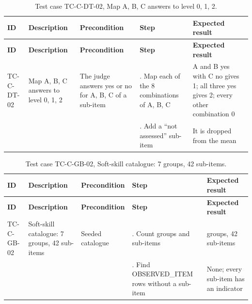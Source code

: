 {\small
\begin{longtable}{|>{\raggedright\arraybackslash}p{}|>{\raggedright\arraybackslash}p{}|>{\raggedright\arraybackslash}p{}|>{\raggedright\arraybackslash}p{}|>{\raggedright\arraybackslash}p{}|}
\caption{Test case TC-C-DT-02, Map A, B, C answers to level 0, 1, 2.} \\
\hline
\textbf{ID} & \textbf{Description} & \textbf{Precondition} & \textbf{Step} & \textbf{Expected result} \\ \hline
\endfirsthead
\hline
\textbf{ID} & \textbf{Description} & \textbf{Precondition} & \textbf{Step} & \textbf{Expected result} \\ \hline
\endhead
TC-C-DT-02 & Map A, B, C answers to level 0, 1, 2 & The judge answers yes or no for A, B, C of a sub-item & 1. Map each of the 8 combinations of A, B, C & A and B yes with C no gives 1; all three yes gives 2; every other combination 0 \\ \hline
 &  &  & 2. Add a ``not assessed'' sub-item & It is dropped from the mean \\ \hline
\end{longtable}
}

{\small
\begin{longtable}{|>{\raggedright\arraybackslash}p{}|>{\raggedright\arraybackslash}p{}|>{\raggedright\arraybackslash}p{}|>{\raggedright\arraybackslash}p{}|>{\raggedright\arraybackslash}p{}|}
\caption{Test case TC-C-GB-02, Soft-skill catalogue: 7 groups, 42 sub-items.} \\
\hline
\textbf{ID} & \textbf{Description} & \textbf{Precondition} & \textbf{Step} & \textbf{Expected result} \\ \hline
\endfirsthead
\hline
\textbf{ID} & \textbf{Description} & \textbf{Precondition} & \textbf{Step} & \textbf{Expected result} \\ \hline
\endhead
TC-C-GB-02 & Soft-skill catalogue: 7 groups, 42 sub-items & Seeded catalogue & 1. Count groups and sub-items & 7 groups, 42 sub-items \\ \hline
 &  &  & 2. Find OBSERVED\_ITEM rows without a sub-item & None; every sub-item has an indicator \\ \hline
\end{longtable}
}

